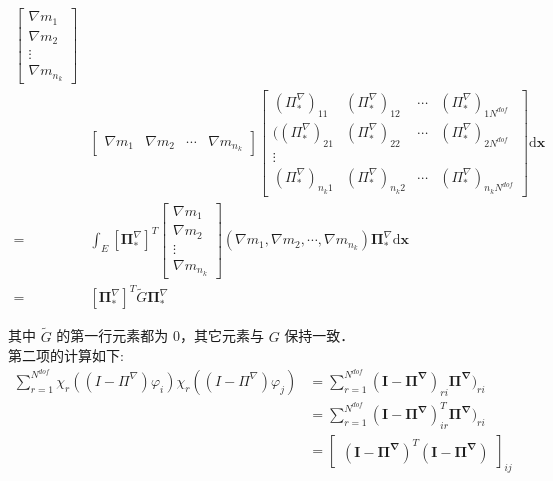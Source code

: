 \begin{equation*}
\begin{aligned}
\begin{bmatrix} 
\nabla m_{1}\\ 
\nabla m_{2} \\ 
\vdots\\
\nabla m_{n_k}
\end{bmatrix}  \\
&\begin{bmatrix} 
\nabla m_{1} & \nabla m_{2} & \cdots &\nabla m_{n_k}
\end{bmatrix}
\begin{bmatrix} 
(\Pi_{*}^{\nabla})_{1 1} & (\Pi_{*}^{\nabla})_{1 2} & \cdots  & (\Pi_{*}^{\nabla})_{1 N^{dof}} \\ 
((\Pi_{*}^{\nabla})_{2 1} & (\Pi_{*}^{\nabla})_{2 2} & \cdots  & (\Pi_{*}^{\nabla})_{2 N^{dof}} \\ 
\vdots\\
(\Pi_{*}^{\nabla})_{n_k 1} & (\Pi_{*}^{\nabla})_{n_k 2} & \cdots  & (\Pi_{*}^{\nabla})_{n_k N^{dof}}
\end{bmatrix} \mathrm d \mathbf x\\
= & \int_E [\boldsymbol \Pi_{*}^\nabla]^T \begin{bmatrix}
\nabla m_1 \\ \nabla m_2 \\\vdots\\ \nabla m_{n_k}
\end{bmatrix}
(\nabla m_1, \nabla m_2, \cdots,  \nabla m_{n_k}) \boldsymbol \Pi_{*}^{\nabla} \mathrm d \mathbf x \\
= & [\boldsymbol \Pi_{*}^\nabla]^T \tilde{G} \boldsymbol \Pi_{*}^\nabla
\end{aligned}
\end{equation*}

其中 $\tilde{G}$ 的第一行元素都为 0，其它元素与 $G$ 保持一致．\\

第二项的计算如下: \\
\begin{equation}
\begin{aligned}
\sum_{r = 1}^{N^{dof}} \chi_r((I-\Pi^{\nabla})\varphi_i) \chi_r((I-\Pi^{\nabla})\varphi_j) & = \sum_{r = 1}^{N^{dof}} (\mathbf{I} - \boldsymbol {\Pi^{\nabla}})_{ri}\boldsymbol {\Pi^{\nabla}})_{ri} \\
& = \sum_{r = 1}^{N^{dof}} (\mathbf{I} - \boldsymbol {\Pi^{\nabla}})_{ir}^T\boldsymbol {\Pi^{\nabla}})_{ri} \\
& = \begin{bmatrix}(\mathbf{I} - \boldsymbol {\Pi^{\nabla}})^T(\mathbf{I} - \boldsymbol {\Pi^{\nabla}})\end{bmatrix}_{ij}
\end{aligned}
\end{equation}

